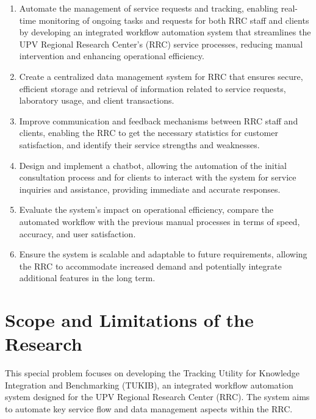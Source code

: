 \begin{enumerate}
   \item Automate the management of service requests and tracking, enabling real-time monitoring of ongoing tasks and requests for both RRC staff and clients by developing an integrated workflow automation system that streamlines the UPV Regional Research Center's (RRC) service processes, reducing manual intervention and enhancing operational efficiency.
   
   \item Create a centralized data management system for RRC that ensures secure, efficient storage and retrieval of information related to service requests, laboratory usage, and client transactions.
   
   \item Improve communication and feedback mechanisms between RRC staff and clients, enabling the RRC to get the necessary statistics for customer satisfaction, and identify their service strengths and weaknesses.
   
   \item Design and implement a chatbot, allowing the automation of the initial consultation process and for clients to interact with the system for service inquiries and assistance, providing immediate and accurate responses.
   
   \item Evaluate the system’s impact on operational efficiency, compare the automated workflow with the previous manual processes in terms of speed, accuracy, and user satisfaction.
   
   \item Ensure the system is scalable and adaptable to future requirements, allowing the RRC to accommodate increased demand and potentially integrate additional features in the long term.
   
\end{enumerate}


\section{Scope and Limitations of the Research}
\label{sec:scopelimitations}

This special problem focuses on developing the Tracking Utility for Knowledge Integration and Benchmarking (TUKIB), an integrated workflow automation system designed for the UPV Regional Research Center (RRC). The system aims to automate key service flow and data management aspects within the RRC. 

